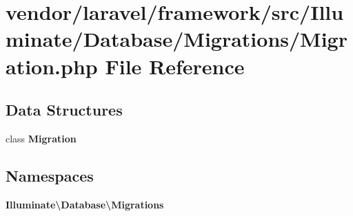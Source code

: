 \section{vendor/laravel/framework/src/\+Illuminate/\+Database/\+Migrations/\+Migration.php File Reference}
\label{_migration_8php}
\subsection*{Data Structures}
\begin{DoxyCompactItemize}
\item 
class {\bf Migration}
\end{DoxyCompactItemize}
\subsection*{Namespaces}
\begin{DoxyCompactItemize}
\item 
 {\bf Illuminate\textbackslash{}\+Database\textbackslash{}\+Migrations}
\end{DoxyCompactItemize}
